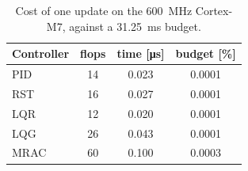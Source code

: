\begin{table}[!ht]
\centering
\caption{Cost of one update on the \SI{600}{\mega\hertz} Cortex-M7, against a \SI{31.25}{\milli\second} budget.}
\label{tab:cost}
\begin{tabular}{lccc}
\toprule
Controller & flops & time [\si{\micro\second}] & budget [\%] \\
\midrule
PID & 14 & 0.023 & 0.0001 \\
RST & 16 & 0.027 & 0.0001 \\
LQR & 12 & 0.020 & 0.0001 \\
LQG & 26 & 0.043 & 0.0001 \\
MRAC & 60 & 0.100 & 0.0003 \\
\bottomrule
\end{tabular}
\end{table}